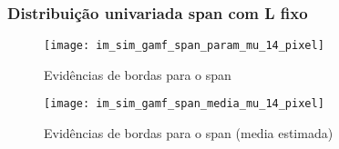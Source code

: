 \subsubsection{Distribuição univariada span com L fixo}    
    
\begin{figure}[hbt]
	\centering
	\texttt{[image: im\_sim\_gamf\_span\_param\_mu\_14\_pixel]}%
	\caption{Evidências de bordas para o span}
\label{fig:evidencias_span_gamf}
\end{figure}
    
    
    
\begin{figure}[hbt]
	\centering
	\texttt{[image: im\_sim\_gamf\_span\_media\_mu\_14\_pixel]}%
	\caption{Evidências de bordas para o span (media estimada)}
\label{fig:evidencias_span_gamf}
\end{figure}
    
    
    


%






